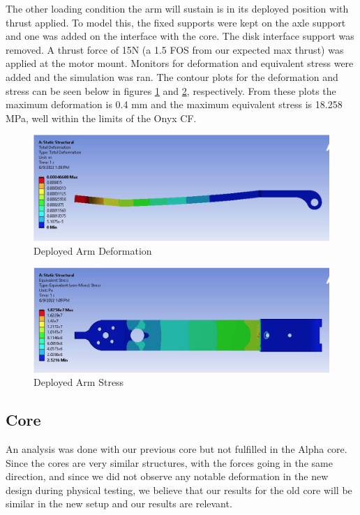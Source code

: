 The other loading condition the arm will sustain is in its deployed position with thrust applied. To model this, the fixed supports were kept on the axle support and one was added on the interface with the core. The disk interface support was removed. A thrust force of 15N (a 1.5 FOS from our expected max thrust) was applied at the motor mount. Monitors for deformation and equivalent stress were added and the simulation was ran. The contour plots for the deformation and stress can be seen below in figures \ref{fig:deployedarmdef} and \ref{fig:deployedarmstress}, respectively. From these plots the maximum deformation is 0.4 mm and the maximum equivalent stress is 18.258 MPa, well within the limits of the Onyx CF. 
\begin{figure}[H]
    \centering
    \includegraphics[width=\textwidth]{src/figs/deployed-arm-def.png}
    \caption{Deployed Arm Deformation}
    \label{fig:deployedarmdef}
\end{figure}
\begin{figure}[H]
    \centering
    \includegraphics[width=\textwidth]{src/figs/deployed-arm-stress.png}
    \caption{Deployed Arm Stress}
    \label{fig:deployedarmstress}
\end{figure}

\subsection{Core}
An analysis was done with our previous core but not fulfilled in the Alpha core. Since the cores are very similar structures, with the forces going in the same direction, and since we did not observe any notable deformation in the new design during physical testing, we believe that our results for the old core will be similar in the new setup and our results are relevant.


